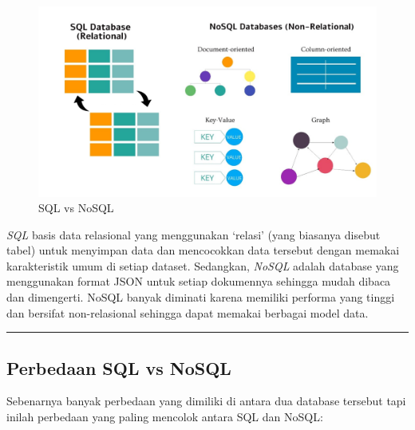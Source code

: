 \documentclass[
]{book}
\begin{document}
\begin{figure}

{\centering \includegraphics[width=1\linewidth]{./images/Bab1/SQLvsNoSQL_DB} 

}

\caption{SQL vs NoSQL}\label{fig:SQLvsNoSQL}
\end{figure}

\emph{SQL} basis data relasional yang menggunakan `relasi' (yang biasanya disebut tabel) untuk menyimpan data dan mencocokkan data tersebut dengan memakai karakteristik umum di setiap dataset. Sedangkan, \emph{NoSQL} adalah database yang menggunakan format JSON untuk setiap dokumennya sehingga mudah dibaca dan dimengerti. NoSQL banyak diminati karena memiliki performa yang tinggi dan bersifat non-relasional sehingga dapat memakai berbagai model data.

\begin{center}\rule{0.5\linewidth}{0.5pt}\end{center}

\hypertarget{perbedaan-sql-vs-nosql}{%
\subsection{Perbedaan SQL vs NoSQL}\label{perbedaan-sql-vs-nosql}}

Sebenarnya banyak perbedaan yang dimiliki di antara dua database tersebut tapi inilah perbedaan yang paling mencolok antara SQL dan NoSQL:
\end{document}
